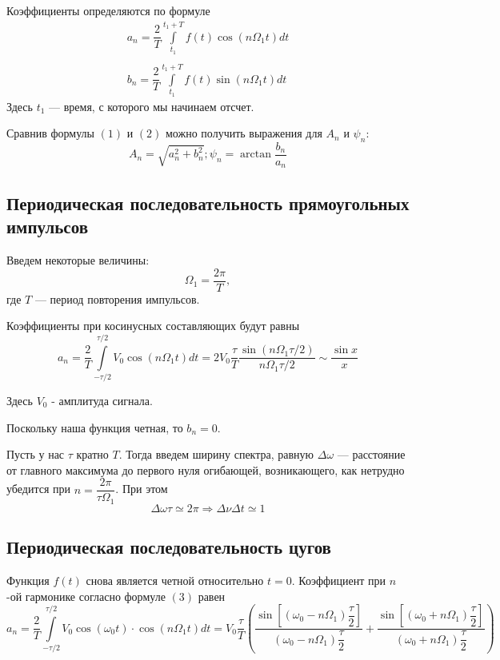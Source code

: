 \documentclass[a4paper, 12pt]{article}
\begin{document}
Коэффициенты определяются по формуле
\begin{equation}
\begin{array}{c}
a_n  = \dfrac{2}{T}\int\limits_{t_1}^{t_1+T}f(t)\cos\left(n \Omega_1 t\right) dt\\
\\
b_n = \dfrac{2}{T}\int\limits_{t_1}^{t_1+T}f(t)\sin\left(n \Omega_1 t\right) dt
\end{array}
\end{equation}
Здесь $t_1$ --- время, с которого мы начинаем отсчет.

Сравнив формулы $(1)$ и $(2)$ можно получить выражения для $A_n$  и $\psi_n$:
\begin{equation}
A_n = \sqrt{a_n^2+b_n^2};\psi_n = \arctan \dfrac{b_n}{a_n}
\end{equation}

\subsection*{Периодическая последовательность прямоугольных импульсов}

Введем некоторые величины:
\[\Omega_1 = \dfrac{2\pi}{T}, \]
где $T$ --- период повторения импульсов.

Коэффициенты при косинусных составляющих будут равны
\begin{equation}
a_n = \dfrac{2}{T}\int\limits_{-\tau/2}^{\tau/2}V_0\cos\left(n\Omega_1 t\right)dt = 2V_0\dfrac{\tau}{T}\dfrac{\sin\left(n\Omega_1\tau/2\right)}{n\Omega_1\tau/2} \sim \dfrac{\sin x}{x}
\end{equation}

Здесь $V_0$ - амплитуда сигнала.

Поскольку наша функция четная, то $b_n = 0$. 

Пусть у нас $\tau$ кратно $T$. Тогда введем ширину спектра, равную $\Delta \omega$ --- расстояние от главного максимума до первого нуля огибающей, возникающего, как нетрудно убедится при $n = \dfrac{2\pi}{\tau \Omega_1}$. При 
этом
\begin{equation}
\label{delta nu*t}
\Delta \omega \tau \simeq 2\pi \Rightarrow \Delta \nu \Delta t \simeq 1
\end{equation}

\subsection*{Периодическая последовательность цугов}
Функция $f(t)$ снова является четной относительно $t = 0$. Коэффициент при $n$-ой гармонике согласно формуле $(3)$ равен
\begin{equation}
a_n = \dfrac{2}{T}\int\limits_{-\tau/2}^{\tau/2}V_0 \cos \left(\omega_0t\right) \cdot \cos\left(n \Omega_1t\right)dt = V_0 \dfrac{\tau}{T}\left( \dfrac{\sin\left[\left(\omega_0 - n \Omega_1\right)\dfrac{\tau}{2}\right]}{\left( \omega_0 - n \Omega_1\right) \dfrac{\tau}{2}} + \dfrac{\sin\left[\left(\omega_0 + n \Omega_1\right)\dfrac{\tau}{2}\right]}{\left( \omega_0 + n \Omega_1\right) \dfrac{\tau}{2}}\right)
\end{equation}
\end{document}
